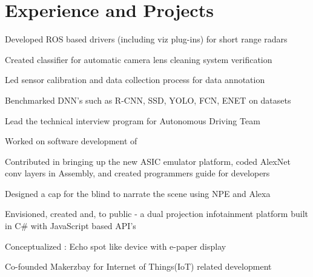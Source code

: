 \documentclass[]{resume-openfont}
\begin{document}
\begin{minipage}[t]{0.63\textwidth} 


\section{Experience and Projects}

\vspace{\topsep} %
\begin{tightemize}
\item Developed ROS based drivers (including viz plug-ins) for short range radars 
\item Created classifier for automatic camera lens cleaning system verification
\item Led sensor calibration and data collection process for data annotation
\item Benchmarked DNN's such as R-CNN, SSD, YOLO, FCN, ENET on datasets
\item Lead the technical interview program for Autonomous Driving Team

\end{tightemize}
\sectionsep

\begin{tightemize}
\item  Worked on software development of  \href{https://developer.qualcomm.com/software/snapdragon-neural-processing-engine}{}
\item Contributed in bringing up the new ASIC emulator platform, coded AlexNet conv layers in Assembly, and created programmers guide  for developers
\item Designed a cap for the blind to narrate the scene using NPE and Alexa

\end{tightemize}
\sectionsep

\begin{tightemize}
\item Envisioned, created and, \href{https://github.com/Microsoft/kinect-ripple}{} to public \href{https://www.youtube.com/watch?v=_0K4iZdMjLw}{} - a dual projection infotainment platform built in C\# with JavaScript based API's
\item Conceptualized \href{http://www.tusharchugh.com/works/orientron/}{} : Echo spot like device with e-paper display 
\item Co-founded Makerzbay for Internet of Things(IoT) related development 
\end{tightemize}
\sectionsep


\end{minipage}
\end{document}
